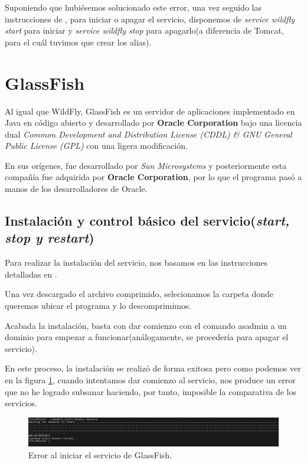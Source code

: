 \documentclass[a4paper, 10pt]{article}
\begin{document}
		Suponiendo que hubiésemos solucionado este error, una vez seguido las instrucciones de
		\cite{WF_install}, para iniciar o apagar el servicio, disponemos de \textit{service
		wildfly start} para iniciar y \textit{service wildfly stop} para apagarlo(a diferencia
		de Tomcat, para el cuál tuvimos que crear los alias).

\section{GlassFish}

	Al igual que WildFly, GlassFish es un servidor de aplicaciones implementado en Java en código
	abierto y desarrollado por \textbf{Oracle Corporation} bajo una licencia dual \textit{Common
	Development and Distribution License (CDDL) \& GNU General Public License (GPL)} con una ligera
	modificación.\cite{GF_official}\cite{GF_install}
	
	En sus orígenes, fue desarrollado por \textit{Sun Microsystems} y posteriormente esta compañía
	fue adquirida por \textbf{Oracle Corporation}, por lo que el programa pasó a manos de los
	desarrolladores de Oracle.

	\subsection{Instalación y control básico del servicio(\textit{start, stop y restart})}
		Para realizar la instalación del servicio, nos basamos en las instrucciones detalladas
		en \cite{GF_install}.
		
		Una vez descargado el archivo comprimido, selecionamos la carpeta donde queremos ubicar
		el programa y lo descomprimimos.
		
		Acabada la instalación, basta con dar comienzo con el comando asadmin a un dominio para
		empezar a funcionar(análogamente, se procedería para apagar el servicio).
		
		En este proceso, la instalación se realizó de forma exitosa pero como podemos ver en la
		figura \ref{fig:GF_Fail}, cuando intentamos dar comienzo al servicio, nos produce un
		error que no he logrado subsanar haciendo, por tanto, imposible la comparativa de los
		servicios.

		\begin{figure}[h!]
			\includegraphics[width=15cm]{Fail_GF.png}
			\caption{Error al iniciar el servicio de GlassFish.}
			\label{fig:GF_Fail}
		\end{figure}
\end{document}
